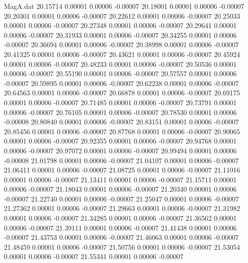 \begin{filecontents}{MagA.dat}
  20.15714    0.00001    0.00006   -0.00007
  20.18001    0.00001    0.00006   -0.00007
  20.20301    0.00001    0.00006   -0.00007
  20.22612    0.00001    0.00006   -0.00007
  20.25033    0.00001    0.00006   -0.00007
  20.27348    0.00001    0.00006   -0.00007
  20.29641    0.00001    0.00006   -0.00007
  20.31933    0.00001    0.00006   -0.00007
  20.34255    0.00001    0.00006   -0.00007
  20.36694    0.00001    0.00006   -0.00007
  20.38998    0.00001    0.00006   -0.00007
  20.41325    0.00001    0.00006   -0.00007
  20.43621    0.00001    0.00006   -0.00007
  20.45924    0.00001    0.00006   -0.00007
  20.48233    0.00001    0.00006   -0.00007
  20.50536    0.00001    0.00006   -0.00007
  20.55190    0.00001    0.00006   -0.00007
  20.57557    0.00001    0.00006   -0.00007
  20.59895    0.00001    0.00006   -0.00007
  20.62238    0.00001    0.00006   -0.00007
  20.64563    0.00001    0.00006   -0.00007
  20.66878    0.00001    0.00006   -0.00007
  20.69175    0.00001    0.00006   -0.00007
  20.71485    0.00001    0.00006   -0.00007
  20.73791    0.00001    0.00006   -0.00007
  20.76105    0.00001    0.00006   -0.00007
  20.78530    0.00001    0.00006   -0.00008
  20.80840    0.00001    0.00006   -0.00007
  20.83151    0.00001    0.00006   -0.00007
  20.85456    0.00001    0.00006   -0.00007
  20.87768    0.00001    0.00006   -0.00007
  20.90065    0.00001    0.00006   -0.00007
  20.92355    0.00001    0.00006   -0.00007
  20.94768    0.00001    0.00006   -0.00007
  20.97072    0.00001    0.00006   -0.00007
  20.99494    0.00001    0.00006   -0.00008
  21.01798    0.00001    0.00006   -0.00007
  21.04107    0.00001    0.00006   -0.00007
  21.06411    0.00001    0.00006   -0.00007
  21.08725    0.00001    0.00006   -0.00007
  21.11016    0.00001    0.00006   -0.00007
  21.13411    0.00001    0.00006   -0.00007
  21.15711    0.00001    0.00006   -0.00007
  21.18043    0.00001    0.00006   -0.00007
  21.20340    0.00001    0.00006   -0.00007
  21.22740    0.00001    0.00006   -0.00007
  21.25047    0.00001    0.00006   -0.00007
  21.27362    0.00001    0.00006   -0.00007
  21.29663    0.00001    0.00006   -0.00007
  21.31982    0.00001    0.00006   -0.00007
  21.34285    0.00001    0.00006   -0.00007
  21.36562    0.00001    0.00006   -0.00007
  21.39111    0.00001    0.00006   -0.00007
  21.41438    0.00001    0.00006   -0.00007
  21.43753    0.00001    0.00006   -0.00007
  21.46063    0.00001    0.00006   -0.00007
  21.48459    0.00001    0.00006   -0.00007
  21.50756    0.00001    0.00006   -0.00007
  21.53054    0.00001    0.00006   -0.00007
  21.55341    0.00001    0.00006   -0.00007

\end{filecontents}
